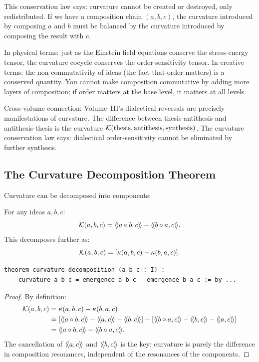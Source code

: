 \begin{interpretation}
This conservation law says: curvature cannot be created or destroyed, only
redistributed. If we have a composition chain $(a, b, c)$, the curvature
introduced by composing $a$ and $b$ must be balanced by the curvature
introduced by composing the result with $c$.

In physical terms: just as the Einstein field equations conserve the
stress-energy tensor, the curvature cocycle conserves the order-sensitivity
tensor. In creative terms: the non-commutativity of ideas (the fact that
order matters) is a conserved quantity. You cannot make composition
commutative by adding more layers of composition; if order matters at the
base level, it matters at all levels.

Cross-volume connection: Volume~III's dialectical reversals are precisely
manifestations of curvature. The difference between thesis-antithesis and
antithesis-thesis is the curvature $\mathcal{K}(\text{thesis}, \text{antithesis},
\text{synthesis})$. The curvature conservation law says: dialectical
order-sensitivity cannot be eliminated by further synthesis.
\end{interpretation}

\subsection{The Curvature Decomposition Theorem}

Curvature can be decomposed into components:

\begin{theorem}
\label{thm:curvature-decomposition}
For any ideas $a, b, c$:
\[
  \mathcal{K}(a, b, c) = \langle\!\langle a \circ b, c \rangle\!\rangle - \langle\!\langle b \circ a, c \rangle\!\rangle.
\]
This decomposes further as:
\[
  \mathcal{K}(a, b, c) = [\kappa(a, b, c) - \kappa(b, a, c)].
\]
\end{theorem}

\begin{lstlisting}[caption={Curvature decomposition (IDT\_v3\_Emergence.lean)}]
theorem curvature_decomposition (a b c : I) :
    curvature a b c = emergence a b c - emergence b a c := by ...
\end{lstlisting}

\begin{proof}
By definition:
\begin{align*}
\curv(a, b, c) &= \emerge(a, b, c) - \emerge(b, a, c) \\
&= [\rs{a \compose b}{c} - \rs{a}{c} - \rs{b}{c}] - [\rs{b \compose a}{c} - \rs{b}{c} - \rs{a}{c}] \\
&= \rs{a \compose b}{c} - \rs{b \compose a}{c}.
\end{align*}
The cancellation of $\langle\!\langle a, c \rangle\!\rangle$ and $\langle\!\langle b, c \rangle\!\rangle$ is the key: curvature is
purely the difference in composition resonances, independent of the resonances
of the components.
\end{proof}

